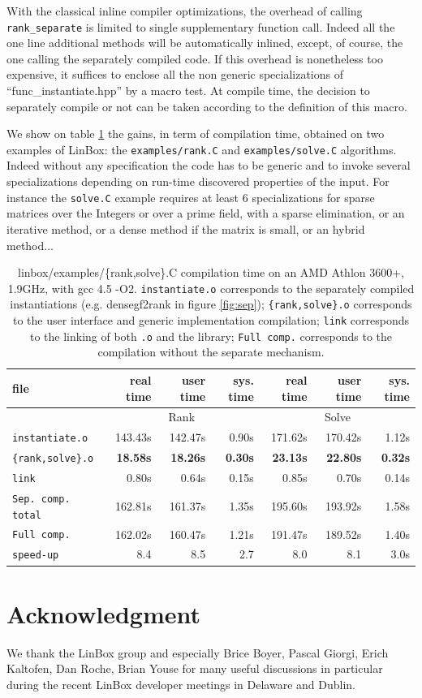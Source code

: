 \documentclass[runningheads,a4paper]{llncs}
\newcommand{\linbox}{{\sc LinBox}\xspace}
\begin{document}
\begin{remark} 
With the classical inline compiler optimizations, the overhead of
calling \texttt{rank\_separate} is limited to single supplementary
function call. Indeed all the one line additional methods will be
automatically inlined, except, of course, the one calling the separately
compiled code.
If this overhead is nonetheless too expensive, it suffices to enclose all the non generic specializations of
``func\_instantiate.hpp'' by a macro test. 
At compile time, the decision to separately
compile or not can be taken according to the definition of this
macro. 
\end{remark}


We show on table \ref{tab:compilation} the gains, in term of compilation time,
obtained on two examples of \linbox: the \texttt{examples/rank.C} and
\texttt{examples/solve.C} algorithms. Indeed without any specification
the code
has to be generic and to invoke several specializations depending on
run-time discovered properties of the input. For instance the
\texttt{solve.C} example requires at least 6 specializations for sparse
matrices over the Integers or over a prime field, with a sparse
elimination, or an iterative method, or a dense method if the matrix
is small, or an hybrid method...
\begin{table}[ht]\center
\begin{tabular}{|l||r|r|r||r|r|r|}
\hline
file                      &  real time   &  user time   &  sys. time  &  real time   &  user time   &  sys. time \\
\hline
 & \multicolumn{3}{|c||}{Rank}& \multicolumn{3}{|c|}{Solve}\\
\hline
\texttt{instantiate.o} & 143.43s & 142.47s & 0.90s & 171.62s & 170.42s & 1.12s\\
\texttt{\{rank,solve\}.o} & \bf 18.58s & \bf 18.26s & \bf 0.30s & \bf 23.13s & \bf 22.80s & \bf 0.32s\\
\texttt{link} & 0.80s & 0.64s & 0.15s & 0.85s & 0.70s & 0.14s\\
\hline
\texttt{Sep. comp. total} & 162.81s & 161.37s & 1.35s & 195.60s & 193.92s & 1.58s\\
\hline
\texttt{Full comp.} & 162.02s & 160.47s & 1.21s & 191.47s & 189.52s & 1.40s\\
\hline
\hline
\texttt{speed-up} & 8.4 & 8.5 & 2.7 & 8.0 & 8.1 & 3.0s\\
\hline
\end{tabular} 
\caption{linbox/examples/\{rank,solve\}.C compilation time on an AMD
  Athlon 3600+, 1.9GHz, with gcc 4.5 -O2. \texttt{instantiate.o} corresponds to the separately compiled
  instantiations (e.g. densegf2rank in figure \ref{fig:sep});
  \texttt{\{rank,solve\}.o} corresponds to the user interface and generic
  implementation compilation; \texttt{link} corresponds to the
  linking of both \texttt{.o} and the library; \texttt{Full comp.}
  corresponds to the compilation without the separate
  mechanism.}\label{tab:compilation}
\end{table}

\section*{Acknowledgment}
We thank the \linbox group and especially Brice Boyer, Pascal Giorgi,
Erich Kaltofen, Dan Roche, Brian Youse for many useful discussions 
in particular during the recent \linbox developer meetings in
Delaware and Dublin.


 
\end{document}
